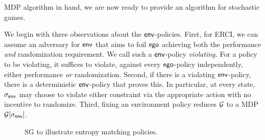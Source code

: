 
MDP algorithm in hand, we are now ready to provide an algorithm for
stochastic games.


 We begin with three observations about
the $\mathsf{env}$-policies.  First, for ERCI, we can assume an adversary for
$\mathsf{env}$ that aims to foil $\mathsf{ego}$ achieving both the performance
\emph{and} randomization requirement. We call such a $\mathsf{env}$-policy
\emph{violating.} For a policy to be violating, it suffices to
violate, against every $\mathsf{ego}$-policy independently, either
performance \emph{or} randomization.  Second, if there is a violating
$\mathsf{env}$-policy, there is a deterministic $\mathsf{env}$-policy that proves
this.  In particular, at every state, ${\sigma_{\mathsf{env}}}$ may choose to
violate either constraint via the appropriate action with no incentive
to randomize. Third, fixing an environment policy reduces $\mathcal{G}$ to a
MDP $\mathcal{G}[{\sigma_{\mathsf{env}}}]$.

\begin{figure}[t]
\centering
\scalebox{0.8}{

}
\caption{SG to illustrate entropy matching policies.}
\label{fig:sg:simplest}
\end{figure}

